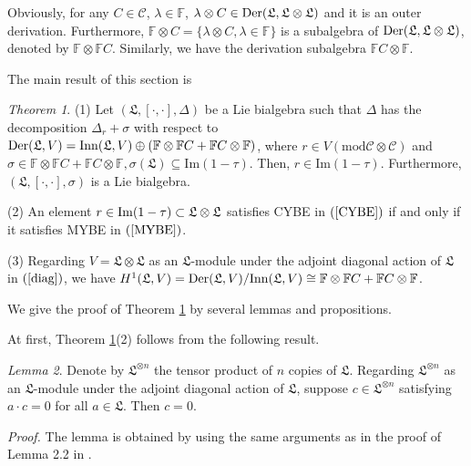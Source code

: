 \documentclass{amsart}
\theoremstyle{definition}
\theoremstyle{remark}
\numberwithin{equation}{subsection}
\numberwithin{equation}{section}
\newtheorem{theo}{Theorem}[section]
\newtheorem{lemm}[theo]{Lemma}
\begin{document}
Obviously, for any $C\in \mathcal {C}$, $\lambda \in \mathbb{F}$,
$\lambda \otimes C \in{{\rm Der}}(\mathfrak{L},\mathfrak{L}\otimes
\mathfrak{L})$ and it is an outer derivation. Furthermore,
$\mathbb{F}\otimes C=\{\lambda\otimes C, \lambda\in \mathbb{F}\}$ is
a subalgebra of ${{\rm Der}}(\mathfrak{L},\mathfrak{L}\otimes
\mathfrak{L})$, denoted by $\mathbb{F}\otimes \mathbb{F} C$.
Similarly, we have the derivation subalgebra $\mathbb{F}C\otimes
\mathbb{F}$.

The main result of this section is
\begin{theo}
\label{main} {\rm(1)} Let $(\mathfrak{L},[\cdot,\cdot],\Delta)$ be a
Lie bialgebra such that $\Delta$ has the decomposition
$\Delta_r+\sigma$  with respect to ${{\rm Der}}({\mathfrak{L}} ,V)=
{{\rm Inn}}({\mathfrak{L}} ,V)\oplus (\mathbb{F}\otimes
\mathbb{F}C+\mathbb{F}C\otimes \mathbb{F})$, where $r\in
V(\mathrm{mod}  \mathcal {C}\otimes \mathcal {C})$ and $\sigma\in
\mathbb{F} \otimes \mathbb{F}C+\mathbb{F}C\otimes \mathbb{F},
\sigma(\mathfrak{L})\subseteq \mathrm{Im}(1-\tau)$. Then, $r\in
\mathrm{Im}(1-\tau)$. Furthermore,
$(\mathfrak{L},[\cdot,\cdot],\sigma)$ is a Lie bialgebra.

 {\rm(2)}
An element $r \in {{\rm Im}}(1 - \tau) \subset {\mathfrak{L}}\otimes
{\mathfrak{L}} $
 satisfies CYBE in $(\ref{CYBE})$ if and only if it
satisfies MYBE in $(\ref{MYBE})$.

{\rm(3)} Regarding $V={\mathfrak{L}} \otimes {\mathfrak{L}}$ as an
${\mathfrak{L}}$-module under the adjoint diagonal action of
${\mathfrak{L}} $ in $(\ref{diag})$, we have $H^1({\mathfrak{L}}
,V)={{\rm Der}}({\mathfrak{L}} ,V)/{{\rm Inn}}({\mathfrak{L}} ,V)\cong
\mathbb{F}\otimes \mathbb{F}C+\mathbb{F}C\otimes \mathbb{F}$.
\end{theo}

We give the proof of Theorem \ref{main} by several lemmas and
propositions.

At first, Theorem \ref{main}(2) follows from the following result.

\begin{lemm}
\label{lemma2} Denote by ${\mathfrak{L}}^{\otimes n}$ the tensor
product of $n$ copies of ${\mathfrak{L}} $. Regarding
${\mathfrak{L}}^{\otimes n}$ as an ${\mathfrak{L}}$-module under the
adjoint diagonal action of ${\mathfrak{L}}$, suppose
$c\in{\mathfrak{L}}^{\otimes n}$ satisfying $a\cdot c=0$ for all
$a\in{\mathfrak{L}} $. Then $c=0$.
\end{lemm}
{\noindent}{\it Proof.} The lemma is obtained by using the same arguments as
in the proof of Lemma 2.2 in {\cite{WSS2}}.
\end{document}
